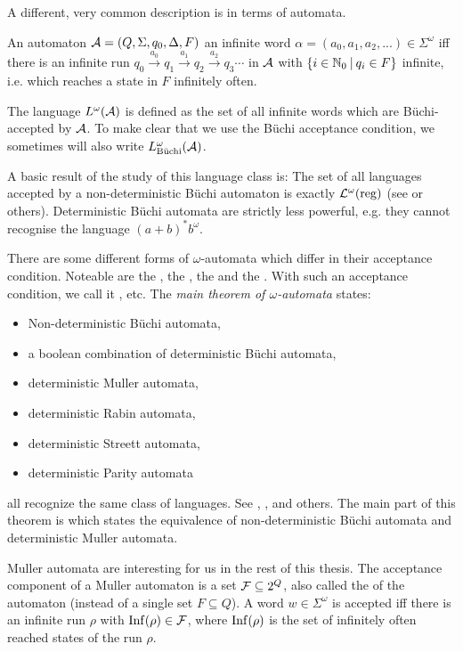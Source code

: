 A different, very common description is in terms of automata.

An automaton $\mathcal{A} = (Q, \Sigma, q_0, \Delta, F)$  an infinite word $\alpha = (a_0,a_1,a_2,...) \in \Sigma^\omega$ iff there is an infinite run $q_0 \xrightarrow{a_0} q_1 \xrightarrow{a_1} q_2 \xrightarrow{a_2} q_3 \cdots$ in $\mathcal{A}$ with $\Set{ i \in \N_0 }{ q_i \in F }$ infinite, i.e. which reaches a state in $F$ infinitely often.

The language $L^\omega(\mathcal{A})$ is defined as the set of all infinite words which are Büchi-accepted by  $\mathcal{A}$. To make clear that we use the Büchi acceptance condition, we sometimes will also write $L^\omega_\text{Büchi}(\mathcal{A})$.

A basic result of the study of this language class is: The set of all languages accepted by a non-deterministic Büchi automaton is exactly $\mathcal{L}^\omega(\textup{\textrm{reg}})$ (see \cite{InfCompR101} or others). %
Deterministic Büchi automata are strictly less powerful, e.g. they cannot recognise the language $(a+b)^* b^\omega$.

There are some different forms of $\omega$-automata which differ in their acceptance condition. Noteable are the , the , the  and the . With such an acceptance condition, we call it , etc. The \emph{main theorem of $\omega$-automata} states:
\begin{itemize}
\item Non-deterministic Büchi automata,
\item a boolean combination of deterministic Büchi automata,
\item deterministic Muller automata,
\item deterministic Rabin automata,
\item deterministic Streett automata,
\item deterministic Parity automata
\end{itemize}
all recognize the same class of languages. See \cite{InfCompR101}, \cite{LangAutLogicR102}, \cite{InfWordsR110} and others. The main part of this theorem is  which states the equivalence of non-deterministic Büchi automata and deterministic Muller automata.

Muller automata are interesting for us in the rest of this thesis. The acceptance component of a Muller automaton is a set $\mathcal{F} \subseteq 2^Q$, also called the  of the automaton (instead of a single set $F \subseteq Q$). A word $w \in \Sigma^\omega$ is accepted iff there is an infinite run $\rho$ with $\operatorname{Inf}(\rho) \in \mathcal{F}$, where $\operatorname{Inf}(\rho)$ is the set of infinitely often reached states of the run $\rho$.


